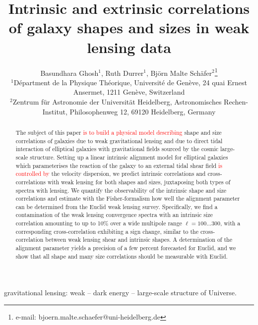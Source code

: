 \documentclass[a4paper,fleqn,usenatbib]{mnras}
\title[Intrinsic sizes and shapes of galaxies]
{Intrinsic and extrinsic correlations of galaxy shapes and sizes in weak lensing data}
\author[B. Ghosh, R. Durrer, B.M. Sch{\"a}fer]
{Basundhara Ghosh$^1$, Ruth Durrer$^1$, Bj{\"o}rn Malte Sch{\"a}fer$^2$\thanks{e-mail: bjoern.malte.schaefer@uni-heidelberg.de}\\
$^1$D{\'e}partment de la Physique Th{\'e}orique, Universit{\'e} de Gen{\`e}ve, 24 quai Ernest Ansermet, 1211 Gen{\`e}ve, Switzerland\\
$^2$Zentrum f{\"u}r Astronomie der Universit{\"a}t Heidelberg, Astronomisches Rechen-Institut, Philosophenweg 12, 69120 Heidelberg, Germany
}
\newcommand\foca[1]{\textcolor{red}{#1}}
\begin{document}
\pagerange{\pageref{firstpage}--\pageref{lastpage}}
\maketitle
\label{firstpage}


\begin{abstract}
The subject of this paper \foca{is to build a physical model describing} shape and size correlations of galaxies due to weak gravitational lensing and due to direct tidal interaction of elliptical galaxies with gravitational fields sourced by the cosmic large-scale structure. Setting up a linear intrinsic alignment model for elliptical galaxies which parameterises the reaction of the galaxy to an external tidal shear field \foca{is controlled by} the velocity dispersion, we predict intrinsic correlations and cross-correlations with weak lensing for both shapes and sizes, juxtaposing both types of spectra with lensing. We quantify the observability of the intrinsic shape and size correlations and estimate with the Fisher-formalism how well the alignment parameter can be determined from the Euclid weak lensing survey. Specifically, we find a contamination of the weak lensing convergence spectra with an intrinsic size correlation amounting to up to 10\%  over a wide multipole range $\ell=100\ldots300$, with a corresponding cross-correlation exhibiting a sign change, similar to the cross-correlation between weak lensing shear and intrinsic shapes. A determination of the alignment parameter yields a precision of a few percent forecasted for Euclid, and we show that all shape and many size correlations should be measurable with Euclid. 
\end{abstract}


\begin{keywords}
gravitational lensing: weak -- dark energy -- large-scale structure of Universe.
\end{keywords}


\end{document}
